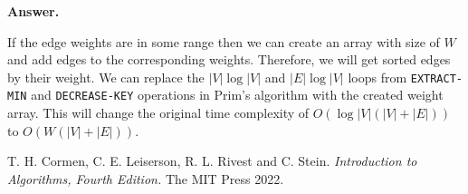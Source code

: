 \documentclass{article}
\begin{document}
\begin{enumerate}
    \textbf{Answer.}

     If the edge weights are in some range then we can create an array with size of $W$ and add edges to the corresponding weights. Therefore, we will get sorted edges by their weight. We can replace the $|V|\log{|V|}$ and $|E|\log{|V|}$ loops from \texttt{EXTRACT-MIN} and \texttt{DECREASE-KEY} operations in Prim's algorithm with the created weight array. This will change the original time complexity of $O(\log{|V|}(|V| + |E|))$ to $O(W(|V| + |E|))$.
     
\end{enumerate}

\begin{thebibliography}{9}
  T. H. Cormen, C. E. Leiserson, R. L. Rivest and C. Stein.
  \textit{Introduction to Algorithms, Fourth Edition.}
  The MIT Press
  2022.
\end{thebibliography}
\end{document}
